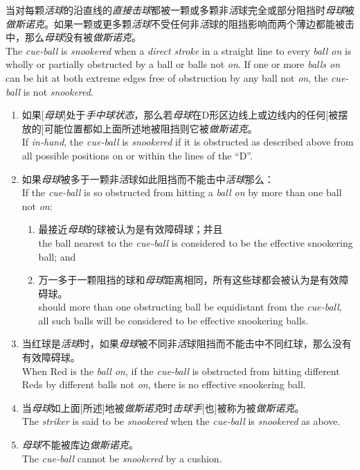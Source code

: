 \noindent 当对每颗\textit{活球}的沿直线的\textit{直接击球}都被一颗或多颗非\textit{活}球完全或部分阻挡时\textit{母球}被\textit{做斯诺克}。如果一颗或更多颗\textit{活球}不受任何非\textit{活}球的阻挡影响而两个薄边都能被击中，那么\textit{母球}没有被\textit{做斯诺克}。\\
The \textit{cue-ball} is \textit{snookered} when a \textit{direct stroke} in a straight line to every \textit{ball on} is wholly or partially obstructed by a ball or balls not \textit{on}. If one or more \textit{balls on} can be hit at both extreme edges free of obstruction by any ball not \textit{on}, the \textit{cue-ball} is not \textit{snookered}.
\begin{enumerate}[label=(\alph*)]
    \item 如果[\textit{母球}]处于\textit{手中球状态}，那么若\textit{母球}在D形区边线上或边线内的任何[被摆放的]可能位置都如上面所述地被阻挡则它被\textit{做斯诺克}。\\
    If \textit{in-hand}, the \textit{cue-ball} is \textit{snookered} if it is obstructed as described above from all possible positions on or within the lines of the ``D''.
    \item 如果\textit{母球}被多于一颗非\textit{活}球如此阻挡而不能击中\textit{活球}那么：\\
    If the \textit{cue-ball} is so obstructed from hitting a \textit{ball on} by more than one ball not \textit{on}:
    \begin{enumerate}[label=(\roman*)]
        \item 最接近\textit{母球}的球被认为是有效障碍球；并且\\
        the ball nearest to the \textit{cue-ball} is considered to be the effective snookering ball; and
        \item 万一多于一颗阻挡的球和\textit{母球}距离相同，所有这些球都会被认为是有效障碍球。\\
        should more than one obstructing ball be equidistant from the \textit{cue-ball}, all such balls will be considered to be effective snookering balls.
    \end{enumerate}
    \item 当红球是\textit{活球}时，如果\textit{母球}被不同非\textit{活}球阻挡而不能击中不同红球，那么没有有效障碍球。\\
    When Red is the \textit{ball on}, if the \textit{cue-ball} is obstructed from hitting different Reds by different balls not \textit{on}, there is no effective snookering ball.
    \item 当\textit{母球}如上面[所述]地被\textit{做斯诺克}时\textit{击球手}[也]被称为被\textit{做斯诺克}。\\
    The \textit{striker} is said to be \textit{snookered} when the \textit{cue-ball} is \textit{snookered} as above.
    \item \textit{母球}不能被库边\textit{做斯诺克}。\\
    The \textit{cue-ball} cannot be \textit{snookered} by a cushion.
\end{enumerate}


